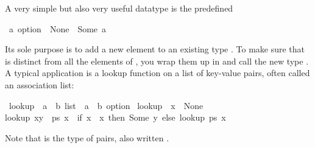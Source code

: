 \begin{isabellebody}
\begin{isamarkuptxt}
A very simple but also very useful datatype is the predefined
\begin{isabelle}%
\ {}a\ option\ {}\ None\ {}\ Some\ {}a%
\end{isabelle}
Its sole purpose is to add a new element  to an existing
type . To make sure that  is distinct from all the
elements of , you wrap them up in  and call
the new type . A typical application is a lookup function
on a list of key-value pairs, often called an association list:%
\end{isamarkuptxt}%
\isamarkuptrue%
%
\endisatagproof
{\isafoldproof}%
%
\isadelimproof
%
\endisadelimproof
{}\isamarkupfalse%
\ lookup\ {}{}\ {}{}{}a\ {}\ {}b{}\ list\ {}\ {}a\ {}\ {}b\ option{}\ \isanewline
{}lookup\ {}{}\ x{}\ {}\ None{}\ {}\isanewline
{}lookup\ {}{}x{}y{}\ {}\ ps{}\ x{}\ {}\ {}if\ x\ {}\ x{}\ then\ Some\ y\ else\ lookup\ ps\ x{}{}{}%
\begin{isamarkuptext}%
Note that  is the type of pairs, also written .


\end{isamarkuptext}
\end{isabellebody}
